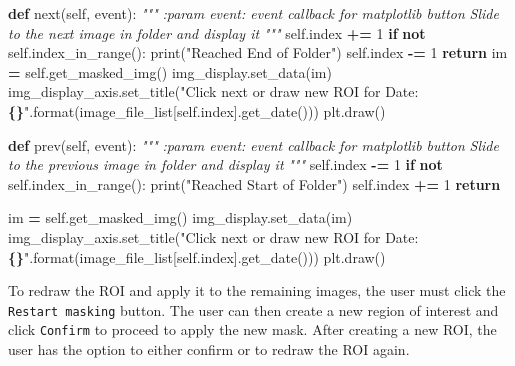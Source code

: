 \documentclass[
]{article}
\newenvironment{Shaded}{\begin{snugshade}}{\end{snugshade}}
\newcommand{\BuiltInTok}[1]{#1}
\newcommand{\CommentTok}[1]{\textcolor[rgb]{0.56,0.35,0.01}{\textit{#1}}}
\newcommand{\ControlFlowTok}[1]{\textcolor[rgb]{0.13,0.29,0.53}{\textbf{#1}}}
\newcommand{\DecValTok}[1]{\textcolor[rgb]{0.00,0.00,0.81}{#1}}
\newcommand{\KeywordTok}[1]{\textcolor[rgb]{0.13,0.29,0.53}{\textbf{#1}}}
\newcommand{\NormalTok}[1]{#1}
\newcommand{\OperatorTok}[1]{\textcolor[rgb]{0.81,0.36,0.00}{\textbf{#1}}}
\newcommand{\SpecialCharTok}[1]{\textcolor[rgb]{0.81,0.36,0.00}{\textbf{#1}}}
\newcommand{\StringTok}[1]{\textcolor[rgb]{0.31,0.60,0.02}{#1}}
\newcommand{\VariableTok}[1]{\textcolor[rgb]{0.00,0.00,0.00}{#1}}
\begin{document}
\begin{Shaded}
\begin{Highlighting}[]
\KeywordTok{def} \BuiltInTok{next}\NormalTok{(}\VariableTok{self}\NormalTok{, event):}
    \CommentTok{"""}
\CommentTok{    :param event: event callback for matplotlib button}
\CommentTok{    Slide to the next image in folder and display it}
\CommentTok{    """}
    \VariableTok{self}\NormalTok{.index }\OperatorTok{+=} \DecValTok{1}
    \ControlFlowTok{if} \KeywordTok{not} \VariableTok{self}\NormalTok{.index\_in\_range():}
        \BuiltInTok{print}\NormalTok{(}\StringTok{"Reached End of Folder"}\NormalTok{)}
        \VariableTok{self}\NormalTok{.index }\OperatorTok{{-}=} \DecValTok{1}
        \ControlFlowTok{return}
\NormalTok{    im }\OperatorTok{=} \VariableTok{self}\NormalTok{.get\_masked\_img()}
\NormalTok{    img\_display.set\_data(im)}
\NormalTok{    img\_display\_axis.set\_title(}\StringTok{"Click next or draw new ROI for Date: }\SpecialCharTok{\{\}}\StringTok{"}\NormalTok{.}\BuiltInTok{format}\NormalTok{(image\_file\_list[}\VariableTok{self}\NormalTok{.index].get\_date()))}
\NormalTok{    plt.draw()}

\KeywordTok{def}\NormalTok{ prev(}\VariableTok{self}\NormalTok{, event):}
    \CommentTok{"""}
\CommentTok{    :param event: event callback for matplotlib button}
\CommentTok{    Slide to the previous image in folder and display it}
\CommentTok{    """}
    \VariableTok{self}\NormalTok{.index }\OperatorTok{{-}=} \DecValTok{1}
    \ControlFlowTok{if} \KeywordTok{not} \VariableTok{self}\NormalTok{.index\_in\_range():}
        \BuiltInTok{print}\NormalTok{(}\StringTok{"Reached Start of Folder"}\NormalTok{)}
        \VariableTok{self}\NormalTok{.index }\OperatorTok{+=} \DecValTok{1}
        \ControlFlowTok{return}

\NormalTok{    im }\OperatorTok{=} \VariableTok{self}\NormalTok{.get\_masked\_img()}
\NormalTok{    img\_display.set\_data(im)}
\NormalTok{    img\_display\_axis.set\_title(}\StringTok{"Click next or draw new ROI for Date: }\SpecialCharTok{\{\}}\StringTok{"}\NormalTok{.}\BuiltInTok{format}\NormalTok{(image\_file\_list[}\VariableTok{self}\NormalTok{.index].get\_date()))}
\NormalTok{    plt.draw()}
\end{Highlighting}
\end{Shaded}

To redraw the ROI and apply it to the remaining images, the user must click the \texttt{Restart\ masking} button. The user can then create a new region of interest and click \texttt{Confirm} to proceed to apply the new mask. After creating a new ROI, the user has the option to either confirm or to redraw the ROI again.
\end{document}
